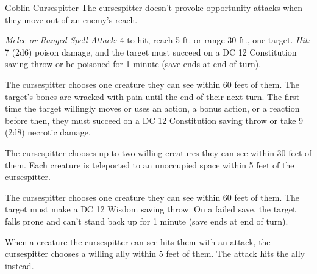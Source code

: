 \documentclass[10pt,a4paper,twoside,bg=print,twocolumn,openany,nodeprecatedcode]{dndbook}
\begin{document}
\begin{DndMonster}[float=t]{Goblin Cursespitter}
\DndMonsterBasics[
armor-class = {15 (\textit{leather armor})},
hit-points = {\DndDice{5d6 + 10}},
speed = {30 ft., climb 20 ft.}
]
\DndMonsterAbilityScores[
 str = 8,
 dex = 14,
 con = 14,
 int = 10,
 wis = 10,
 cha = 15
]
\DndMonsterDetails[
saving-throws = {Wis +2},
skills = {Stealth +4},
senses = {darkvision 60 ft., passive perception 10},
languages = {Common, Goblin},
challenge = 1,
]
The cursespitter doesn't provoke opportunity attacks when they move out of an enemy's reach.

\textsl{Melee or Ranged Spell Attack:} 4 to hit, reach 5 ft. or range 30 ft., one target. \textsl{Hit:} 7 (2d6) poison damage, and the target must succeed on a DC 12 Constitution saving throw or be poisoned for 1 minute (save ends at end of turn).

The cursespitter chooses one creature they can see within 60 feet of them. The target's bones are wracked with pain until the end of their next turn. The first time the target willingly moves or uses an action, a bonus action, or a reaction before then, they must succeed on a DC 12 Constitution saving throw or take 9 (2d8) necrotic damage.

The cursespitter chooses up to two willing creatures they can see within 30 feet of them. Each creature is teleported to an unoccupied space within 5 feet of the cursespitter.

The cursespitter chooses one creature they can see within 60 feet of them. The target must make a DC 12 Wisdom saving throw. On a failed save, the target falls prone and can't stand back up for 1 minute (save ends at end of turn).

When a creature the cursespitter can see hits them with an attack, the cursespitter chooses a willing ally within 5 feet of them. The attack hits the ally instead.

\end{DndMonster}
\end{document}
